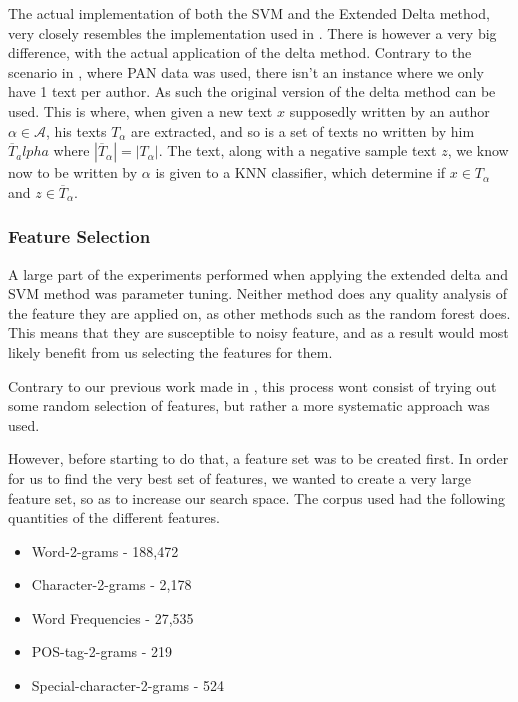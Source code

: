 The actual implementation of both the \gls{SVM} and the Extended Delta method,
very closely resembles the implementation used in \cite{US}. There is however
a very big difference, with the actual application of the delta method.
Contrary to the scenario in \cite{US}, where PAN data was used, there isn't an
instance where we only have 1 text per author. As such the original version
of the delta method can be used. This is where, when given a new text $x$
supposedly written by an author $\alpha \in \mathcal{A}$, his texts $T_\alpha$
are extracted, and so is a set of texts no written by him $\overline{T}_alpha$
where $|\overline{T}_\alpha| = |T_\alpha|$. The text, along with a negative
sample text $z$, we know now to be written by $\alpha$ is given to a \gls{KNN}
classifier, which determine if $x \in T_\alpha$ and $z \in \overline{T}_\alpha$.

\subsubsection{Feature Selection}

A large part of the experiments performed when applying the extended delta and
\gls{SVM} method was parameter tuning. Neither method does any quality analysis
of the feature they are applied on, as other methods such as the random forest
does. This means that they are susceptible to noisy feature, and as a result
would most likely benefit from us selecting the features for them.

Contrary to our previous work made in \cite{US}, this process wont
consist of trying out some random selection of features, but rather
a more systematic approach was used.

However, before starting to do that, a feature set was to be created
first. In order for us to find the very best set of features, we wanted
to create a very large feature set, so as to increase our search space.
The corpus used had the following quantities of the different features.

\begin{itemize}
    \item Word-2-grams - 188,472
    \item Character-2-grams - 2,178
    \item Word Frequencies - 27,535
    \item \gls{POS}-tag-2-grams - 219
    \item Special-character-2-grams - 524
\end{itemize}

